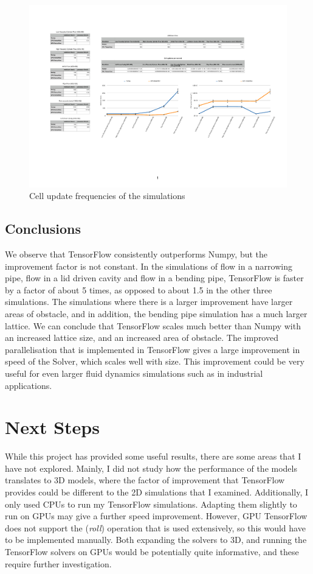 \documentclass{article}
\begin{document}
\begin{figure}[H] 
	\centering
	\label{freqgraph}
	\includegraphics[width=5in]{Diagrams/FreqGraph.pdf}
	\caption{Cell update frequencies of the simulations}
\end{figure}

\subsection{Conclusions}

We observe that TensorFlow consistently outperforms Numpy, but the improvement factor is not constant. In the simulations of flow in a narrowing pipe, flow in a lid driven cavity and flow in a bending pipe, TensorFlow is faster by a factor of about 5 times, as opposed to about 1.5 in the other three simulations. The simulations where there is a larger improvement have larger areas of obstacle, and in addition, the bending pipe simulation has a much larger lattice. We can conclude that TensorFlow scales much better than Numpy with an increased lattice size, and an increased area of obstacle. The improved parallelisation that is implemented in TensorFlow gives a large improvement in speed of the Solver, which scales well with size. This improvement could be very useful for even larger fluid dynamics simulations such as in industrial applications.

\section{Next Steps}

While this project has provided some useful results, there are some areas that I have not explored. Mainly, I did not study how the performance of the models translates to 3D models, where the factor of improvement that TensorFlow provides could be different to the 2D simulations that I examined. Additionally, I only used CPUs to run my TensorFlow simulations. Adapting them slightly to run on GPUs may give a further speed improvement. However, GPU TensorFlow does not support the (\emph{roll}) operation that is used extensively, so this would have to be implemented manually. Both expanding the solvers to 3D, and running the TensorFlow solvers on GPUs would be potentially quite informative, and these require further investigation.
\end{document}
